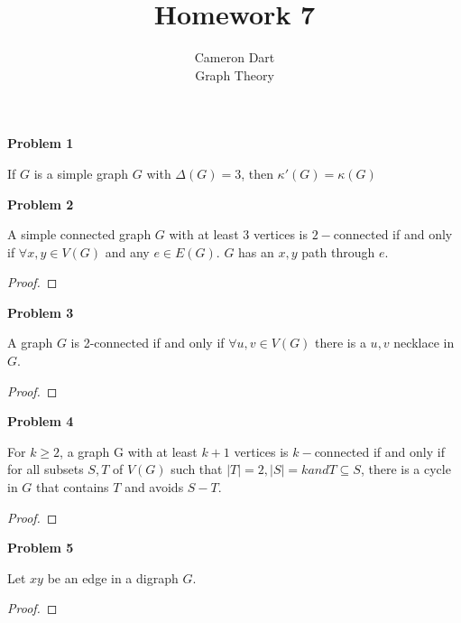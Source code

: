 \documentclass{article}
\newenvironment{claim}[2][Claim]{\begin{trivlist}
		\item[\hskip \labelsep {\bfseries #1}\hskip \labelsep {\bfseries #2}]}{\end{trivlist}}
\begin{document}
\title{Homework 7} 
\author{Cameron Dart\\ Graph Theory} 

\maketitle

\noindent \textbf{Problem 1}
\begin{claim}{}
	If $G$ is a simple graph $G$ with $\Delta(G) = 3$, then $\kappa'(G) = \kappa(G)$
\end{claim}

\noindent \textbf{Problem 2}
\begin{claim}{}
A simple connected graph $G$ with at least $3$ vertices is $2-$connected if and only if $\forall x,y \in V(G)$ and any $e \in E(G)$. $G$ has an $x,y$ path through $e$.
\end{claim}
\begin{proof}

\end{proof}

\noindent \textbf{Problem 3}
\begin{claim}{}
A graph $G$ is 2-connected if and only if $\forall u,v \in V(G)$ there is a $u,v$ necklace in $G$.
\end{claim}
\begin{proof}

\end{proof}

\noindent \textbf{Problem 4}
\begin{claim}{}
For $k \geq 2$, a graph G with at least $k + 1$ vertices is $k-$connected if and only if for all subsets $S, T$ of $V (G)$ such that $|T| = 2, |S| = k and T \subseteq S$, there is a cycle in $G$ that contains $T$ and avoids $S - T$.
\end{claim}
\begin{proof}

\end{proof}

\noindent \textbf{Problem 5}
\begin{claim}{}
Let $xy$ be an edge in a digraph $G$.
\end{claim}
\begin{proof}

\end{proof}
\end{document}
